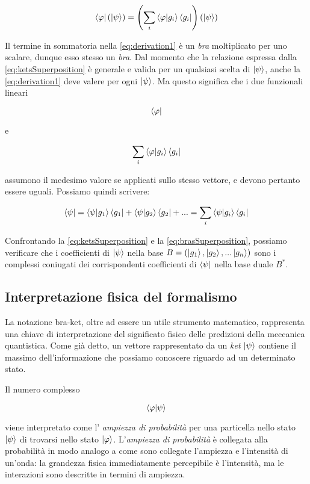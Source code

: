 	\begin{equation} \label{eq:derivation1}
		\bra{\varphi}(\ket{\psi}) = \left( \sum_i \braket{\varphi}{g_i} \bra{g_i} \right) (\ket{\psi})
	\end{equation}

Il termine in sommatoria nella \eqref{eq:derivation1} è un \textit{bra} moltiplicato per uno scalare, dunque esso stesso un \textit{bra}. Dal momento che la relazione espressa dalla \eqref{eq:ketsSuperposition} è generale e valida per un qualsiasi scelta di $\ket{\psi}$, anche la \eqref{eq:derivation1} deve valere per ogni $\ket{\psi}$. Ma questo significa che i due funzionali lineari

	\[
		\bra{\varphi}
	\]

e

	\[
		\sum_i \braket{\varphi}{g_i} \bra{g_i}
	\]


assumono il medesimo valore se applicati sullo stesso vettore, e devono pertanto essere uguali. Possiamo quindi scrivere:

	\begin{equation} \label{eq:brasSuperposition}
		\bra{\psi} = \braket{\psi}{g_1} \bra{g_1} + \braket{\psi}{g_2} \bra{g_2} + ... = \sum_i \braket{\psi}{g_i} \bra{g_i}
	\end{equation}

Confrontando la \eqref{eq:ketsSuperposition} e la \eqref{eq:brasSuperposition}, possiamo verificare che i coefficienti di $\ket{\psi}$ nella base $B = (\ket{g_1}, \ket{g_2},... \ket{g_n})$ sono i complessi coniugati dei corrispondenti coefficienti di $\bra{\psi}$ nella base duale $B^*$.

\subsection{Interpretazione fisica del formalismo}

La notazione bra-ket, oltre ad essere un utile strumento matematico, rappresenta una chiave di interpretazione del significato fisico delle predizioni della meccanica quantistica. Come già detto, un vettore rappresentato da un \textit{ket} $\ket{\psi}$ contiene il massimo dell'informazione che possiamo conoscere riguardo ad un determinato stato. 

Il numero complesso 

	\[
		\braket{\varphi}{\psi}
	\]

viene interpretato come l' \textit{ampiezza di probabilità} per una particella nello stato $\ket{\psi}$ di trovarsi nello stato $\ket{\varphi}$. L'\textit{ampiezza di probabilità} è collegata alla probabilità in modo analogo a come sono collegate l'ampiezza e l'intensità di un'onda: la grandezza fisica immediatamente percepibile è l'intensità, ma le interazioni sono descritte in termini di ampiezza.

